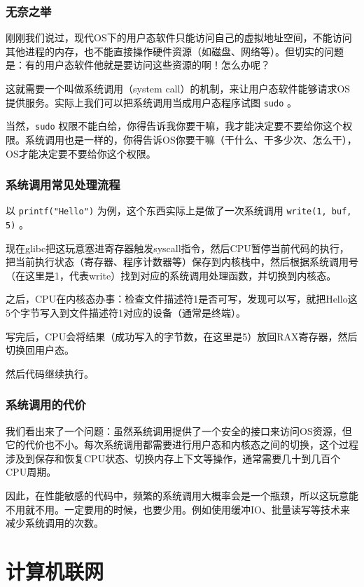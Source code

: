 \documentclass[fontset=none,aspectratio=1610]{ctexbeamer}
\begin{document}
\begin{frame}
    \frametitle{无奈之举}

    刚刚我们说过，现代OS下的用户态软件只能访问自己的虚拟地址空间，不能访问其他进程的内存，也不能直接操作硬件资源（如磁盘、网络等）。但切实的问题是：有的用户态软件他就是要访问这些资源的啊！怎么办呢？

    这就需要一个叫做系统调用（system call）的机制，来让用户态软件能够请求OS提供服务。实际上我们可以把系统调用当成用户态程序试图 \texttt{sudo} 。

    当然，\texttt{sudo} 权限不能白给，你得告诉我你要干嘛，我才能决定要不要给你这个权限。系统调用也是一样的，你得告诉OS你要干嘛（干什么、干多少次、怎么干），OS才能决定要不要给你这个权限。

\end{frame}

\begin{frame}
    \frametitle{系统调用常见处理流程}

    以 \texttt{printf("Hello")} 为例，这个东西实际上是做了一次系统调用 \texttt{write(1, buf, 5)} 。
    
    现在glibc把这玩意塞进寄存器触发syscall指令，然后CPU暂停当前代码的执行，把当前执行状态（寄存器、程序计数器等）保存到内核栈中，然后根据系统调用号（在这里是1，代表write）找到对应的系统调用处理函数，并切换到内核态。
    
    之后，CPU在内核态办事：检查文件描述符1是否可写，发现可以写，就把Hello这5个字节写入到文件描述符1对应的设备（通常是终端）。
    
    写完后，CPU会将结果（成功写入的字节数，在这里是5）放回RAX寄存器，然后切换回用户态。
    
    然后代码继续执行。

\end{frame}

\begin{frame}
    \frametitle{系统调用的代价}

    我们看出来了一个问题：虽然系统调用提供了一个安全的接口来访问OS资源，但它的代价也不小。每次系统调用都需要进行用户态和内核态之间的切换，这个过程涉及到保存和恢复CPU状态、切换内存上下文等操作，通常需要几十到几百个CPU周期。

    因此，在性能敏感的代码中，频繁的系统调用大概率会是一个瓶颈，所以这玩意能不用就不用。一定要用的时候，也要少用。例如使用缓冲IO、批量读写等技术来减少系统调用的次数。

\end{frame}

\section{计算机联网}
\end{document}
